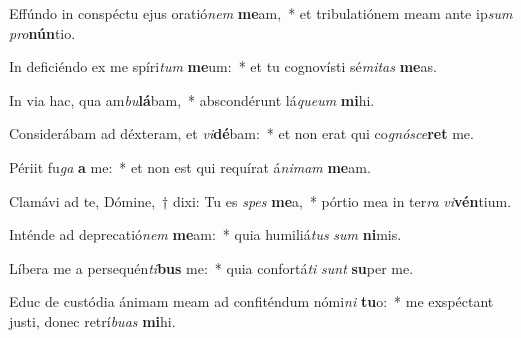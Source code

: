 \item Effúndo in conspéctu ejus oratió\textit{nem} \textbf{me}am,~* et tribulatiónem meam ante ip\textit{sum} \textit{pro}\textbf{nún}tio.
\item In deficiéndo ex me spíri\textit{tum} \textbf{me}um:~* et tu cognovísti sé\textit{mi}\textit{tas} \textbf{me}as.
\item In via hac, qua am\textit{bu}\textbf{lá}bam,~* abscondérunt lá\textit{que}\textit{um} \textbf{mi}hi.
\item Considerábam ad déxteram, et \textit{vi}\textbf{dé}bam:~* et non erat qui co\textit{gnó}\textit{sce}\textbf{ret} me.
\item Périit fu\textit{ga} \textbf{a} me:~* et non est qui requírat á\textit{ni}\textit{mam} \textbf{me}am.
\item Clamávi ad te, Dómine,~† dixi: Tu es \textit{spes} \textbf{me}a,~* pórtio mea in ter\textit{ra} \textit{vi}\textbf{vén}tium.
\item Inténde ad deprecatió\textit{nem} \textbf{me}am:~* quia humiliá\textit{tus} \textit{sum} \textbf{ni}mis.
\item Líbera me a persequén\textit{ti}\textbf{bus} me:~* quia confortá\textit{ti} \textit{sunt} \textbf{su}per me.
\item Educ de custódia ánimam meam ad confiténdum nómi\textit{ni} \textbf{tu}o:~* me exspéctant justi, donec retrí\textit{bu}\textit{as} \textbf{mi}hi.
